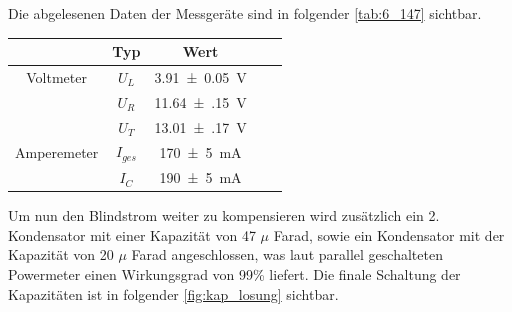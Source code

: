 \documentclass[11pt,ngerman]{scrartcl}
\begin{document}
Die abgelesenen Daten der Messgeräte sind in folgender \autoref{tab:6_147} sichtbar.

\begin{table}[H]
	\begin{center}
		\begin{tabular}{|c|c|c|c|c|} \hline
			{}          & \textbf{Typ} & \textbf{Wert}      \\ \hline
			Voltmeter   & $U_{L}$      & \SI{3.91(5)}{\V}   \\
			            & $U_{R}$      & \SI{11.64(15)}{\V} \\
			            & $U_{T}$      & \SI{13.01(17)}{\V} \\ \hline
			Amperemeter & $I_{ges}$    & \SI{170(5)}{\mA}   \\
			            & $I_{C}$      & \SI{190(5)}{\mA}   \\ \hline
		\end{tabular}
		\label{tab:6_147}
	\end{center}
\end{table}


Um nun den Blindstrom weiter zu kompensieren wird zusätzlich ein 2. Kondensator mit einer Kapazität von 47 $\mu$ Farad, sowie ein Kondensator mit der Kapazität von 20 $\mu$ Farad angeschlossen, was laut parallel geschalteten Powermeter einen Wirkungsgrad von 99\% liefert. Die finale Schaltung der Kapazitäten ist in folgender \autoref{fig:kap_losung} sichtbar.
\end{document}
